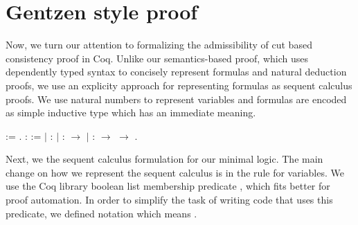 \section{Gentzen style proof}\label{sec:admissibility}


Now, we turn our attention to formalizing the admissibility of cut based consistency proof in Coq.
Unlike our semantics-based proof, which uses dependently typed syntax to concisely represent formulas and
natural deduction proofs, we use an explicity approach for representing formulas as sequent calculus proofs.
We use natural numbers to represent variables and formulas are encoded as simple inductive type which has
an immediate meaning.
 \begin{coqdoccode}
\coqdocemptyline
\coqdocnoindent
{}  := .\coqdoceol
\coqdocemptyline
\coqdocnoindent
{} \coqdocvar{$\alpha$} :  :=\coqdoceol
\coqdocnoindent
\ensuremath{|}   : \coqdocvar{$\alpha$} \coqdoceol
\coqdocnoindent
\ensuremath{|}      :  \ensuremath{\rightarrow} \coqdocvar{$\alpha$}\coqdoceol
\coqdocnoindent
\ensuremath{|}  : \coqdocvar{$\alpha$} \ensuremath{\rightarrow} \coqdocvar{$\alpha$} \ensuremath{\rightarrow} \coqdocvar{$\alpha$}.\coqdoceol
\coqdocemptyline
\end{coqdoccode}
Next, we the sequent calculus formulation for our minimal logic.
The main change on how we represent the sequent calculus is in the
rule for variables. We use the Coq library boolean list membership predicate
, which fits better for proof automation. In order to
simplify the task of writing code that uses this predicate, we defined
notation  \coqdocvar{$\in$}  which means   . 


